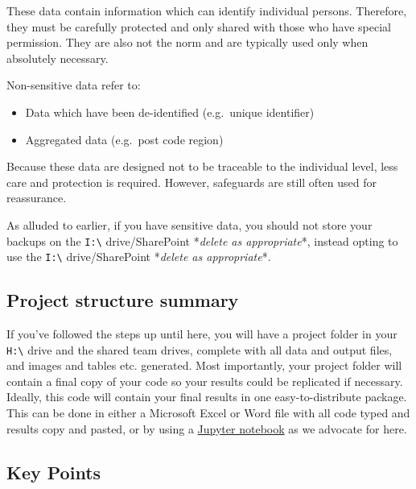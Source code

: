 \documentclass[]{book}
\providecommand{\tightlist}{%
  \setlength{\itemsep}{0pt}\setlength{\parskip}{0pt}}
\begin{document}
These data contain information which can identify individual persons. Therefore, they must be carefully protected and only shared with those who have special permission. They are also not the norm and are typically used only when absolutely necessary.

Non-sensitive data refer to:

\begin{itemize}
\tightlist
\item
  Data which have been de-identified (e.g.~unique identifier)
\item
  Aggregated data (e.g.~post code region)
\end{itemize}

Because these data are designed not to be traceable to the individual level, less care and protection is required. However, safeguards are still often used for reassurance.

As alluded to earlier, if you have sensitive data, you should not store your backups on the \texttt{I:\textbackslash{}} drive/SharePoint *\emph{delete as appropriate}*, instead opting to use the \texttt{I:\textbackslash{}} drive/SharePoint *\emph{delete as appropriate}*.

\hypertarget{project-structure-summary}{%
\subsection{Project structure summary}\label{project-structure-summary}}

If you've followed the steps up until here, you will have a project folder in your \texttt{H:\textbackslash{}} drive and the shared team drives, complete with all data and output files, and images and tables etc. generated. Most importantly, your project folder will contain a final copy of your code so your results could be replicated if necessary. Ideally, this code will contain your final results in one easy-to-distribute package. This can be done in either a Microsoft Excel or Word file with all code typed and results copy and pasted, or by using a \protect\hyperlink{jupyter-notebooks}{Jupyter notebook} as we advocate for here.

\hypertarget{key-points}{%
\subsection{Key Points}\label{key-points}}
\end{document}
